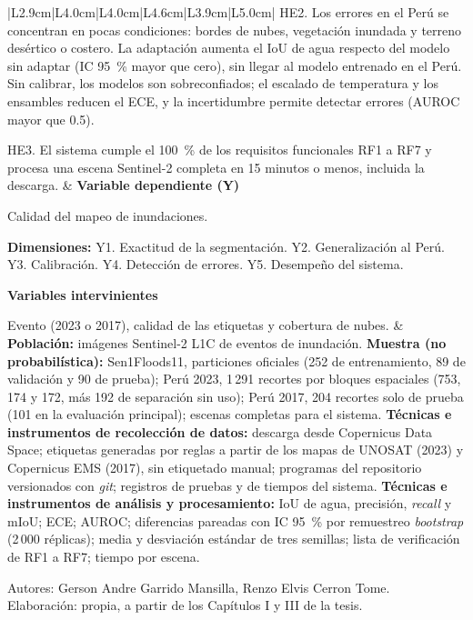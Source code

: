 \documentclass[10pt]{article}
\newcommand{\ingles}[1]{\textit{#1}}
\newcommand{\sub}[1]{\textbf{#1}\par}
\newcommand{\autores}{Gerson Andre Garrido Mansilla, Renzo Elvis Cerron Tome}
\begin{document}
{\begin{longtable}{|L{2.9cm}|L{4.0cm}|L{4.0cm}|L{4.6cm}|L{3.9cm}|L{5.0cm}|}
HE2. Los errores en el Perú se concentran en pocas condiciones: bordes de nubes, vegetación
inundada y terreno desértico o costero. La adaptación aumenta el IoU de agua respecto del modelo
sin adaptar (IC 95~\% mayor que cero), sin llegar al modelo entrenado en el Perú. Sin calibrar, los
modelos son sobreconfiados; el escalado de temperatura y los ensambles reducen el ECE, y la
incertidumbre permite detectar errores (AUROC mayor que 0.5).

HE3. El sistema cumple el 100~\% de los requisitos funcionales RF1 a RF7 y procesa una escena
Sentinel-2 completa en 15 minutos o menos, incluida la descarga.
&
\sub{Variable dependiente (Y)}
Calidad del mapeo de inundaciones.

\textbf{Dimensiones:}
Y1. Exactitud de la segmentación.\newline
Y2. Generalización al Perú.\newline
Y3. Calibración.\newline
Y4. Detección de errores.\newline
Y5. Desempeño del sistema.

\sub{Variables intervinientes}
Evento (2023 o 2017), calidad de las etiquetas y cobertura de nubes.
&
\textbf{Población:} imágenes Sentinel-2 L1C de eventos de inundación.\newline
\textbf{Muestra (no probabilística):} Sen1Floods11, particiones oficiales (252 de entrenamiento,
89 de validación y 90 de prueba); Perú 2023, 1\,291 recortes por bloques espaciales (753, 174 y
172, más 192 de separación sin uso); Perú 2017, 204 recortes solo de prueba (101 en la evaluación
principal); escenas completas para el sistema.\newline
\textbf{Técnicas e instrumentos de recolección de datos:} descarga desde Copernicus Data Space;
etiquetas generadas por reglas a partir de los mapas de UNOSAT (2023) y Copernicus EMS (2017),
sin etiquetado manual; programas del repositorio versionados con \ingles{git}; registros de
pruebas y de tiempos del sistema.\newline
\textbf{Técnicas e instrumentos de análisis y procesamiento:} IoU de agua, precisión,
\ingles{recall} y mIoU; ECE; AUROC; diferencias pareadas con IC 95~\% por remuestreo
\ingles{bootstrap} (2\,000 réplicas); media y desviación estándar de tres semillas; lista de
verificación de RF1 a RF7; tiempo por escena.
\\ \hline
\end{longtable}}

Autores: \autores.\\
Elaboración: propia, a partir de los Capítulos I y III de la tesis.
\end{document}
